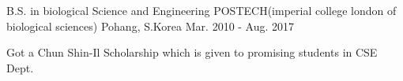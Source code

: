 

\begin{cventries}

  \cventry
    {B.S. in biological Science and Engineering} %
    {POSTECH(imperial college london of biological sciences)} %
    {Pohang, S.Korea} %
    {Mar. 2010 - Aug. 2017} %
    {
      \begin{cvitems} %
        \item {Got a Chun Shin-Il Scholarship which is given to promising students in CSE Dept.}
      \end{cvitems}
    }

\end{cventries}
